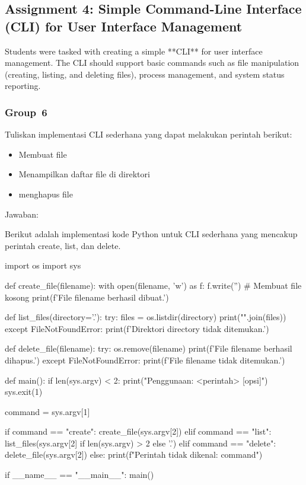 \documentclass[12pt]{article}
\begin{document}
\subsection{Assignment 4: Simple Command-Line Interface (CLI) for User Interface Management}
Students were tasked with creating a simple **CLI** for user interface management. The CLI should support basic commands such as file manipulation (creating, listing, and deleting files), process management, and system status reporting.
\subsubsection {Group 6}
Tuliskan implementasi CLI sederhana yang dapat melakukan perintah berikut:
\begin{itemize}
    \item Membuat file
    \item Menampilkan daftar file di direktori
    \item menghapus file
\end{itemize}
Jawaban:


Berikut adalah implementasi kode Python untuk CLI sederhana yang mencakup perintah create, list, dan delete.
\begin{python}
        import os
        import sys

        def create_file(filename):
            with open(filename, 'w') as f:
                f.write('')  # Membuat file kosong
            print(f'File {filename} berhasil dibuat.')

        def list_files(directory='.'):
            try:
                files = os.listdir(directory)
                print("\n".join(files))
            except FileNotFoundError:
                print(f'Direktori {directory} tidak ditemukan.')

        def delete_file(filename):
            try:
                os.remove(filename)
                print(f'File {filename} berhasil dihapus.')
            except FileNotFoundError:
                print(f'File {filename} tidak ditemukan.')

        def main():
            if len(sys.argv) < 2:
                print("Penggunaan: <perintah> [opsi]")
                sys.exit(1)

            command = sys.argv[1]

            if command == "create":
                create_file(sys.argv[2])
            elif command == "list":
                list_files(sys.argv[2] if len(sys.argv) > 2 else '.')
            elif command == "delete":
                delete_file(sys.argv[2])
            else:
                print(f"Perintah tidak dikenal: {command}")

        if __name__ == "__main__":
            main()

\end{python}
\end{document}
